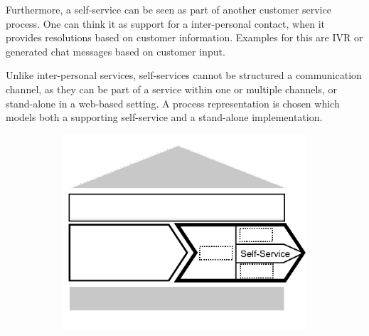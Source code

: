 	 Furthermore, a self-service can be seen as part of another customer service process. One can think it as support for a inter-personal contact, when it provides resolutions based on customer information. Examples for this are \acrshort{IVR} or generated chat messages based on customer input.
	 
	 Unlike inter-personal services, self-services cannot be structured \wrt a communication channel, as they can be part of a service within one or multiple channels, or stand-alone in a web-based setting. A process representation is chosen which models both a supporting self-service and a stand-alone implementation.
	 
	 \begin{figure}[caption={\textsc{Self-Service} Process}, label={fig:selfservice}]
	 	\begin{subfigure}[b]{.45\textwidth}
	 		\begin{center}
	 			\includegraphics{figures/processes/selfservice.pdf}
	 		\end{center}
	 	\end{subfigure}
	 	\begin{subfigure}[b]{.45\textwidth}
	 		\begin{center}
	 		\end{center}
	 	\end{subfigure}
	 	
	 \end{figure}
	 
